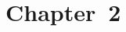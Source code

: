 \documentclass[letterpaper]{article}
\newcommand{\exercise}[2][]{\noindent\textbf{Exercise~{#2}}\ifthenelse{\isempty{#1}}{\textbf{.}}{ ({#1})\textbf{.}}}
\newcommand{\N}{\mathbb{N}}
\newcommand{\funcr}[3]{f_{{#1},{#2}}^{(#3)}}
\theoremstyle{plain}
\theoremstyle{definition}
\theoremstyle{remark}
\begin{document}



\section*{Chapter~2}
\end{document}
